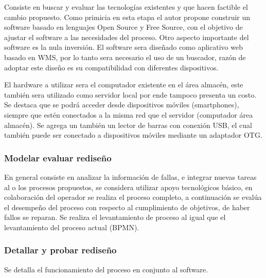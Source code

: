 \documentclass[11pt]{article}
\begin{document}
Consiste en buscar y evaluar las tecnologías existentes y que hacen
factible el cambio propuesto. Como primicia en esta etapa el autor
propone construir un software basado en lenguajes Open Source y Free
Source, con el objetivo de ajustar el software a las necesidades del
proceso. Otro aspecto importante del software es la nula inversión. El
software sera diseñado como aplicativo web basado en WMS, por lo tanto
sera necesario el uso de un buscador, razón de adoptar este diseño es su
compatibilidad con diferentes dispositivos.

El hardware a utilizar sera el computador existente en el área almacén,
este también sera utilizado como servidor local por ende tampoco
presenta un costo. Se destaca que se podrá acceder desde dispositivos
móviles (smartphones), siempre que estén conectados a la misma red que
el servidor (computador área almacén). Se agrega un también un lector de
barras con conexión USB, el cual también puede ser conectado a
dispositivos móviles mediante un adaptador OTG.

\hypertarget{modelar-evaluar-rediseuxf1o}{%
\subsubsection{Modelar evaluar
rediseño}\label{modelar-evaluar-rediseuxf1o}}

En general consiste en analizar la información de fallas, e integrar
nuevas tareas al o los procesos propuestos, se considera utilizar apoyo
tecnológicos básico, en colaboración del operador se realiza el proceso
completo, a continuación se evalúa el desempeño del proceso con respecto
al cumplimiento de objetivos, de haber fallos se reparan. Se realiza el
levantamiento de proceso al igual que el levantamiento del proceso
actual (BPMN).

\hypertarget{detallar-y-probar-rediseuxf1o}{%
\subsubsection{Detallar y probar
rediseño}\label{detallar-y-probar-rediseuxf1o}}

Se detalla el funcionamiento del proceso en conjunto al software.
\end{document}
